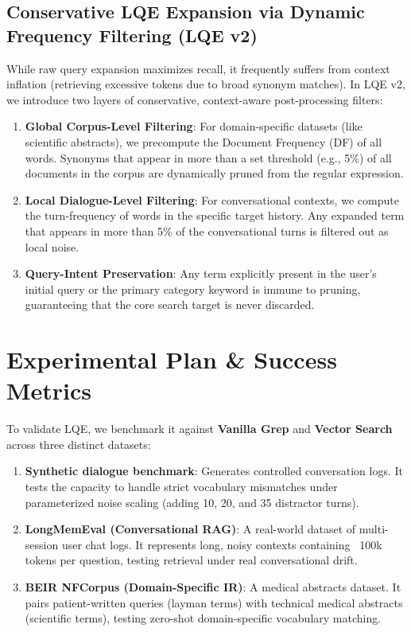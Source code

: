 \documentclass[11pt,a4paper]{article}
\begin{document}
\subsection{Conservative LQE Expansion via Dynamic Frequency Filtering (LQE v2)}
While raw query expansion maximizes recall, it frequently suffers from context inflation (retrieving excessive tokens due to broad synonym matches). In LQE v2, we introduce two layers of conservative, context-aware post-processing filters:
\begin{enumerate}
    \item \textbf{Global Corpus-Level Filtering}: For domain-specific datasets (like scientific abstracts), we precompute the Document Frequency (DF) of all words. Synonyms that appear in more than a set threshold (e.g., 5\%) of all documents in the corpus are dynamically pruned from the regular expression.
    \item \textbf{Local Dialogue-Level Filtering}: For conversational contexts, we compute the turn-frequency of words in the specific target history. Any expanded term that appears in more than 5\% of the conversational turns is filtered out as local noise.
    \item \textbf{Query-Intent Preservation}: Any term explicitly present in the user's initial query or the primary category keyword is immune to pruning, guaranteeing that the core search target is never discarded.
\end{enumerate}

\section{Experimental Plan & Success Metrics}
To validate LQE, we benchmark it against \textbf{Vanilla Grep} and \textbf{Vector Search} across three distinct datasets:

\begin{enumerate}
    \item \textbf{Synthetic dialogue benchmark}: Generates controlled conversation logs. It tests the capacity to handle strict vocabulary mismatches under parameterized noise scaling (adding 10, 20, and 35 distractor turns).
    \item \textbf{LongMemEval (Conversational RAG)}: A real-world dataset of multi-session user chat logs. It represents long, noisy contexts containing ~100k tokens per question, testing retrieval under real conversational drift.
    \item \textbf{BEIR NFCorpus (Domain-Specific IR)}: A medical abstracts dataset. It pairs patient-written queries (layman terms) with technical medical abstracts (scientific terms), testing zero-shot domain-specific vocabulary matching.
\end{enumerate}
\end{document}
